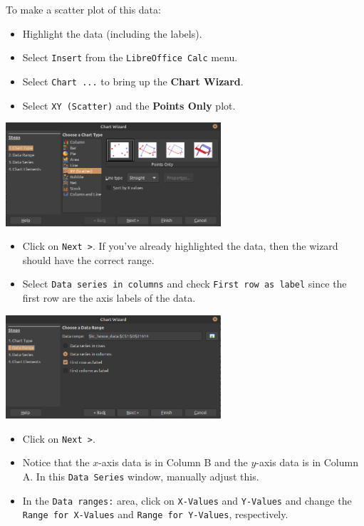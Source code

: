 \noindent To make a scatter plot of this data:
  \begin{itemize}
      \item Highlight the data (including the labels).
      \item Select {\tt Insert} from the {\tt LibreOffice Calc} menu.
      \item Select {\tt Chart ...} to bring up the {\bf Chart Wizard}.
      \item Select {\tt XY (Scatter)} and the {\bf Points Only} plot.
    \end{itemize}
\begin{center}
  \includegraphics[width = 0.6\textwidth]{img/chap1/sec1-3/scatterplot1.png}
\end{center}
  \begin{itemize}
      \item Click on {\tt Next >}. If you've already highlighted the data, then the wizard should have the correct range.
      \item Select {\tt Data series in columns} and check {\tt First row as label} since the first row are the axis labels of the data.
    \end{itemize}
  \begin{center}
  \includegraphics[width = 0.6\textwidth]{img/chap1/sec1-3/scatterplot-column-2.png}
  \end{center}
  \begin{itemize}
    \item Click on {\tt Next >}.
    \item Notice that the $x$-axis data is in Column B and the $y$-axis data is in Column A. In this {\tt Data Series} window, manually adjust this.
    \item In the {\tt Data ranges:} area, click on {\tt X-Values} and {\tt Y-Values} and change the {\tt Range for X-Values} and {\tt Range for Y-Values}, respectively.
  \end{itemize}
